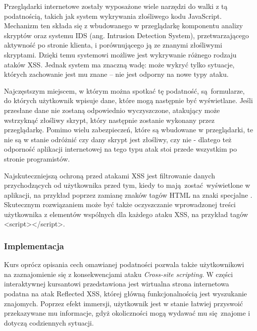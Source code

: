 \documentclass[12pt,twoside]{article}
\begin{document}
Przeglądarki internetowe zostały wyposażone wiele narzędzi do walki z tą podatnością, takich jak system wykrywania złośliwego kodu JavaScript. Mechanizm ten składa się z wbudowanego w przeglądarkę komponentu analizy skryptów oraz systemu IDS (ang. Intrusion Detection System), przetwarzającego aktywność po stronie klienta, i porównującego ją ze znanymi złośliwymi skryptami. Dzięki temu systemowi możliwe jest wykrywanie różnego rodzaju ataków XSS. Jednak system ma znaczną wadę: może wykryć tylko sytuacje, których zachowanie jest mu znane -- nie jest odporny na nowe typy ataku. \cite{XSSProtection}

Najczęstszym miejscem, w którym można spotkać tę podatność, są formularze, do których użytkownik wpisuje dane, które mogą następnie być wyświetlane. Jeśli przesłane dane nie zostaną odpowiednio wyczyszczone, atakujący może wstrzyknąć złośliwy skrypt, który następnie zostanie wykonany przez przeglądarkę. Pomimo wielu zabezpieczeń, które są wbudowane w przeglądarki, te nie są w stanie odróżnić czy dany skrypt jest złośliwy, czy nie - dlatego też odporność aplikacji internetowej na tego typu atak stoi przede wszystkim po stronie programistów.
	
Najskuteczniejszą ochroną przed atakami XSS jest filtrowanie danych przychodzących od użytkownika przed tym, kiedy to mają zostać wyświetlone w aplikacji, na przykład poprzez zamianę znaków tagów HTML na znaki specjalne \cite{XSSSpecialTags}. Skutecznym rozwiązaniem może być także oczyszczanie wprowadzonej treści użytkownika z elementów wspólnych dla każdego ataku XSS, na przykład tagów <script></script>.
	
\subsubsection{Implementacja}

Kurs oprócz opisania cech omawianej podatności pozwala także użytkownikowi na zaznajomienie się z konsekwencjami ataku \emph{Cross-site scripting}. W części interaktywnej kursantowi przedstawiona jest wirtualna strona internetowa podatna na atak Reflected XSS, której główną funkcjonalnością jest wyszukanie znajomych. Poprzez efekt immersji, użytkownik jest w stanie łatwiej przyswoić przekazywane mu informacje, gdyż okoliczności mogą wydawać mu się znajome i dotyczą codziennych sytuacji.
\end{document}
